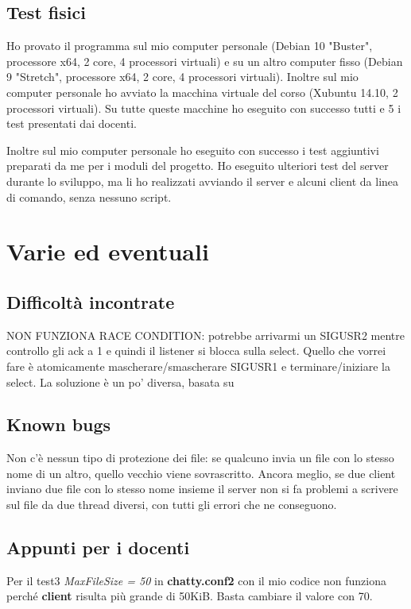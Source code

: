 \documentclass[a4paper]{article}
\theoremstyle{theorem}
\theoremstyle{remark}
\theoremstyle{definition}
\theoremstyle{corollary}
\theoremstyle{lemma}
\newcommand\file[1]{%
	\textbf{#1}}
\begin{document}
\subsection{Test fisici}
Ho provato il programma sul mio computer personale (Debian 10 "Buster", processore x64, 2 core, 4 processori virtuali) e su un altro computer fisso (Debian 9 "Stretch", processore x64, 2 core, 4 processori virtuali). Inoltre sul mio computer personale ho avviato la macchina virtuale del corso (Xubuntu 14.10, 2 processori virtuali). Su tutte queste macchine ho eseguito con successo tutti e 5 i test presentati dai docenti.

Inoltre sul mio computer personale ho eseguito con successo i test aggiuntivi preparati da me per i moduli del progetto. Ho eseguito ulteriori test del server durante lo sviluppo, ma li ho realizzati avviando il server e alcuni client da linea di comando, senza nessuno script.

\section{Varie ed eventuali}
\subsection{Difficoltà incontrate}\label{difficolta}
NON FUNZIONA RACE CONDITION: potrebbe arrivarmi un SIGUSR2 mentre controllo gli ack a 1 e quindi il listener si blocca sulla select. Quello che vorrei fare è atomicamente mascherare/smascherare SIGUSR1 e terminare/iniziare la select. La soluzione è un po' diversa, basata su 

\subsection{Known bugs}
Non c'è nessun tipo di protezione dei file: se qualcuno invia un file con lo stesso nome di un altro, quello vecchio viene sovrascritto. Ancora meglio, se due client inviano due file con lo stesso nome insieme il server non si fa problemi a scrivere sul file da due thread diversi, con tutti gli errori che ne conseguono.

\subsection{Appunti per i docenti}
Per il test3 \textit{MaxFileSize = 50} in \file{chatty.conf2} con il mio codice non funziona perché \file{client} risulta più grande di 50KiB. Basta cambiare il valore con 70.
\
\end{document}
